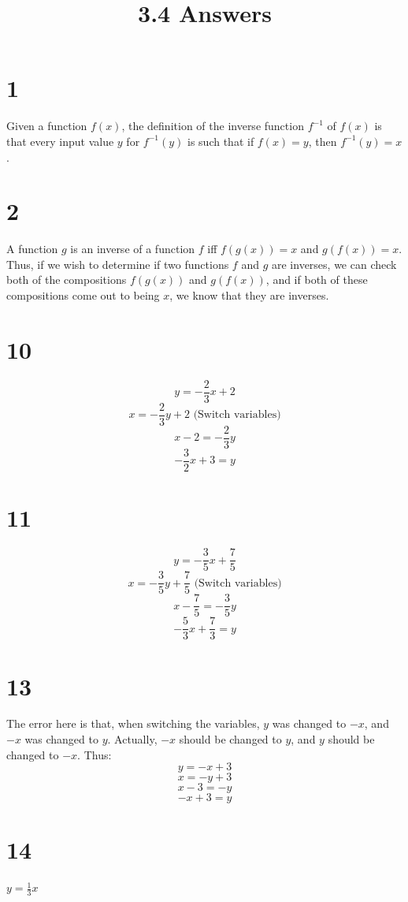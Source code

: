 \documentclass{article}
\title{3.4 Answers}
\theoremstyle{definition}
\begin{document}
\maketitle

\section*{1}


Given a function $f(x)$, the definition of the inverse function $f^{-1}$ of $f(x)$ is that every input value $y$ for $f^{-1}(y)$ is such that if 
$f(x)=y$, then $f^{-1}(y)=x$.

\section*{2}


A function $g$ is an inverse of a function $f$ iff $f(g(x))=x$ and $g(f(x))=x$. Thus, if we wish to determine if two functions $f$ and $g$ are 
inverses, we can check both of the compositions $f(g(x))$ and $g(f(x))$, and if both of these compositions come out to being $x$, we know that they 
are inverses.

\section*{10}
\[ y=-\frac{2}{3}x+2 \]
\[ x=-\frac{2}{3}y+2 \textrm{ (Switch variables)} \]
\[ x-2=-\frac{2}{3}y \]
\[ -\frac{3}{2}x+3=y \]

\section*{11}
\[ y=-\frac{3}{5}x+\frac{7}{5} \]
\[ x=-\frac{3}{5}y+\frac{7}{5} \textrm{ (Switch variables)} \]
\[ x-\frac{7}{5}=-\frac{3}{5}y \]
\[ -\frac{5}{3}x+\frac{7}{3}=y \]

\section*{13}


The error here is that, when switching the variables, $y$ was changed to $-x$, and $-x$ was changed to $y$. Actually, $-x$ should be changed to $y$, 
and $y$ should be changed to $-x$. Thus:
\[ y=-x+3 \]
\[ x=-y+3 \]
\[ x-3=-y \]
\[ -x+3=y \]

\section*{14}
$y=\frac{1}{3}x$
\end{document}
